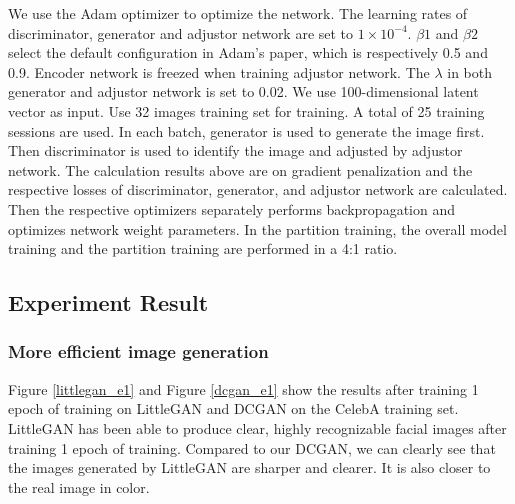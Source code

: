 We use the Adam optimizer to optimize the network.
The learning rates of discriminator, generator and adjustor network are set to $1\times10^{-4}$.
$\beta1$ and $\beta2$ select the default configuration in Adam's paper, which is respectively 0.5 and 0.9.
Encoder network is freezed when training adjustor network.
The $\lambda$ in both generator and adjustor network is set to 0.02.
We use 100-dimensional latent vector as input.
Use 32 images training set for training.
A total of 25 training sessions are used.
In each batch, generator is used to generate the image first.
Then discriminator is used to identify the image and adjusted by adjustor network.
The calculation results above are on gradient penalization and the respective losses of discriminator, generator, and adjustor network are calculated.
Then the respective optimizers separately performs backpropagation and optimizes network weight parameters.
In the partition training, the overall model training and the partition training are performed in a 4:1 ratio.

\subsection{Experiment Result}
\subsubsection*{More efficient image generation}
Figure \ref{littlegan_e1} and Figure \ref{dcgan_e1} show the results after training 1 epoch of training on LittleGAN and DCGAN on the CelebA training set.
LittleGAN has been able to produce clear, highly recognizable facial images after training 1 epoch of training.
Compared to our DCGAN, we can clearly see that the images generated by LittleGAN are sharper and clearer.
It is also closer to the real image in color.


